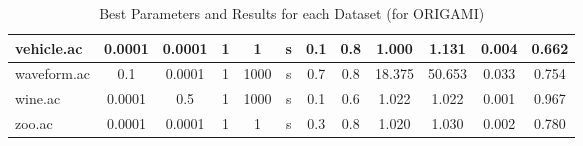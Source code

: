 \begin{table}[htbp]
\begin{tabular}{|l|c|c|c|c|c|c|c||c|c|c|c|}
		\hline
		vehicle.ac     & 0.0001   & 0.0001      & 1              & 1                   & s        & 0.1    & 0.8   & 1.000          & 1.131          & 0.004          & 0.662          \\
		\hline
		waveform.ac    & 0.1      & 0.0001      & 1              & 1000                & s        & 0.7    & 0.8   & 18.375         & 50.653         & 0.033          & 0.754          \\
		\hline
		wine.ac        & 0.0001   & 0.5         & 1              & 1000                & s        & 0.1    & 0.6   & 1.022          & 1.022          & 0.001          & 0.967          \\
		\hline
		zoo.ac         & 0.0001   & 0.0001      & 1              & 1                   & s        & 0.3    & 0.8   & 1.020          & 1.030          & 0.002          & 0.780          \\
		\hline
		\end{tabular}
	\caption{Best Parameters and Results for each Dataset (for ORIGAMI)}
	\label{tab:best_runs_for_each_db_origami}
\end{table}